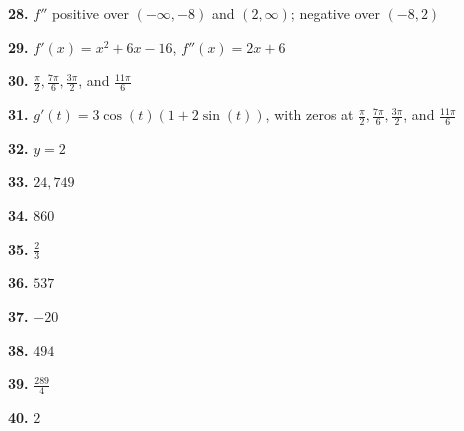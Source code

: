 \documentclass[12pt,]{book}
\theoremstyle{plain}
\theoremstyle{definition}
\numberwithin{equation}{section}
\newcommand{\fe}[2]{#1\mathopen{}\left(#2\right)\mathclose{}}
\newcommand{\ointerval}[2]{\left(#1,#2\right)}
\newcommand{\fd}[1]{#1'}
\newcommand{\sd}[1]{#1''}
\begin{document}
                \par\smallskip
\noindent\textbf{28.}\quad{}
                    \(\sd{f}\) positive over \(\ointerval{-\infty}{-8}\) and \(\ointerval{2}{\infty}\); negative over \(\ointerval{-8}{2}\)%

                \par\smallskip
\noindent\textbf{29.}\quad{}
                    \(\fe{\fd{f}}{x}=x^2+6x-16\), \(\fe{\sd{f}}{x}=2x+6\)%

                \par\smallskip
\noindent\textbf{30.}\quad{}
                    \(\frac{\pi}{2},\frac{7\pi}{6},\frac{3\pi}{2}\), and \(\frac{11\pi}{6}\)%

                \par\smallskip
\noindent\textbf{31.}\quad{}
                    \(\fe{\fd{g}}{t}=3\fe{\cos}{t}\left(1+2\fe{\sin}{t}\right)\), with zeros at \(\frac{\pi}{2},\frac{7\pi}{6},\frac{3\pi}{2}\), and \(\frac{11\pi}{6}\)%

                \par\smallskip
\noindent\textbf{32.}\quad{}
                \(y=2\)%

            \par\smallskip
\noindent\textbf{33.}\quad{}
                    \(24{,}749\)%

                \par\smallskip
\noindent\textbf{34.}\quad{}
                    \(860\)%

                \par\smallskip
\noindent\textbf{35.}\quad{}
                    \(\frac{2}{3}\)%

                \par\smallskip
\noindent\textbf{36.}\quad{}
                    \(537\)%

                \par\smallskip
\noindent\textbf{37.}\quad{}
                    \(-20\)%

                \par\smallskip
\noindent\textbf{38.}\quad{}
                    \(494\)%

                \par\smallskip
\noindent\textbf{39.}\quad{}
                    \(\frac{289}{4}\)%

                \par\smallskip
\noindent\textbf{40.}\quad{}
                    \(2\)%

                \par\smallskip
\end{document}
